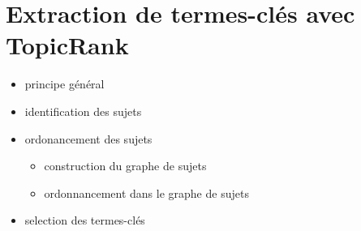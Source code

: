 \section{Extraction de termes-clés avec TopicRank}
\label{sec:extraction_de_termes_cles_avec_topicrank}
  \begin{itemize}
    \item{principe général}
    \item{identification des sujets}
    \item{ordonancement des sujets}
    \begin{itemize}
      \item{construction du graphe de sujets}
      \item{ordonnancement dans le graphe de sujets}
    \end{itemize}
    \item{selection des termes-clés}
  \end{itemize}

